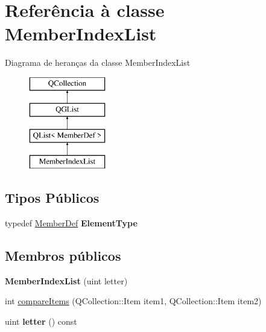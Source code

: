 \hypertarget{class_member_index_list}{\section{Referência à classe Member\-Index\-List}
\label{class_member_index_list}
}
Diagrama de heranças da classe Member\-Index\-List\begin{figure}[H]
\begin{center}
\leavevmode
\includegraphics[height=4.000000cm]{class_member_index_list}
\end{center}
\end{figure}
\subsection*{Tipos Públicos}
\begin{DoxyCompactItemize}
\item 
\hypertarget{class_member_index_list_aa5618c67c4d943763781d0a3a2929dd6}{typedef \hyperlink{class_member_def}{Member\-Def} {\bfseries Element\-Type}}\label{class_member_index_list_aa5618c67c4d943763781d0a3a2929dd6}

\end{DoxyCompactItemize}
\subsection*{Membros públicos}
\begin{DoxyCompactItemize}
\item 
\hypertarget{class_member_index_list_afdbfb40217051524fd361e026dc3b6ed}{{\bfseries Member\-Index\-List} (uint letter)}\label{class_member_index_list_afdbfb40217051524fd361e026dc3b6ed}

\item 
int \hyperlink{class_member_index_list_a219450accf048597ffc7113ecde4c402}{compare\-Items} (Q\-Collection\-::\-Item item1, Q\-Collection\-::\-Item item2)
\item 
\hypertarget{class_member_index_list_ada472040436550156c7064317abe8caa}{uint {\bfseries letter} () const }\label{class_member_index_list_ada472040436550156c7064317abe8caa}

\end{DoxyCompactItemize}
